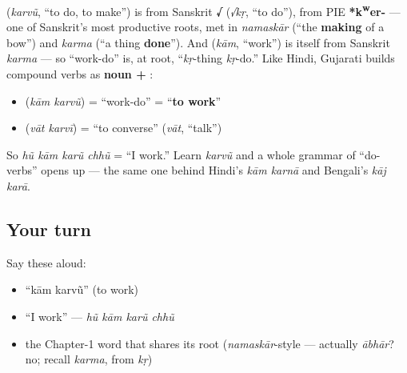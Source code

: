 \begin{cousinweb}
\textbf{} (\emph{karvũ}, \textquotedblleft{}to do, to make\textquotedblright{}) is from Sanskrit \textbf{√} (\emph{√kṛ}, \textquotedblleft{}to do\textquotedblright{}), from PIE \textbf{*k\textsuperscript{w}er-} — one of Sanskrit's most productive roots, met in \emph{namaskār} (\textquotedblleft{}the \textbf{making} of a bow\textquotedblright{}) and \emph{karma} (\textquotedblleft{}a thing \textbf{done}\textquotedblright{}). And \textbf{} (\emph{kām}, \textquotedblleft{}work\textquotedblright{}) is itself from Sanskrit \emph{karma} — so \textquotedblleft{}work-do\textquotedblright{} is, at root, \textquotedblleft{}\emph{kṛ}-thing \emph{kṛ}-do.\textquotedblright{} Like Hindi, Gujarati builds compound verbs as \textbf{noun + }:

\begin{itemize}
\raggedright
  \item \textbf{ } (\emph{kām karvũ}) = \textquotedblleft{}work-do\textquotedblright{} = \textquotedblleft{}\textbf{to work}\textquotedblright{}
  \item \textbf{ } (\emph{vāt karvī}) = \textquotedblleft{}to converse\textquotedblright{} (\emph{vāt}, \textquotedblleft{}talk\textquotedblright{})
\end{itemize}

So \emph{hũ kām karũ chhũ} = \textquotedblleft{}I work.\textquotedblright{} Learn \emph{karvũ} and a whole grammar of \textquotedblleft{}do-verbs\textquotedblright{} opens up — the same one behind Hindi's \emph{kām karnā} and Bengali's \emph{kāj karā}.
\end{cousinweb}

\subsection*{Your turn}
Say these aloud:

\begin{itemize}
\raggedright
  \item \textquotedblleft{}kām karvũ\textquotedblright{} (to work)
  \item \textquotedblleft{}I work\textquotedblright{} — \emph{hũ kām karũ chhũ}
  \item the Chapter-1 word that shares its root (\emph{namaskār}-style — actually \emph{ābhār}? no; recall \emph{karma}, from \emph{kṛ})
\end{itemize}

